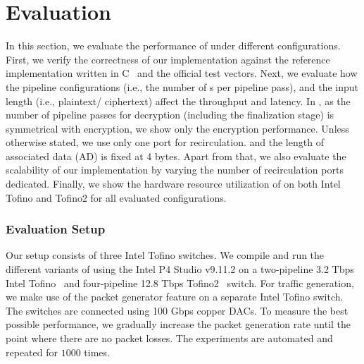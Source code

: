 \section{Evaluation}
\label{sec:eval}

In this section, we evaluate the performance of \sysname under different configurations.
First, we verify the correctness of our implementation against the reference implementation written in C~\cite{ascon-github} and the official test vectors.
Next, we evaluate how the pipeline configurations (i.e., the number of {\pround}s per pipeline pass), and the input length (i.e., plaintext/ ciphertext) affect the throughput and latency.
In \sysname, as the number of pipeline passes for decryption (including the finalization stage) is symmetrical with encryption, 
we show only the encryption performance.
Unless otherwise stated, we use only one port for recirculation. and the length of associated data (AD) is fixed at 4 bytes.
Apart from that, we also evaluate the scalability of our implementation by varying the number of recirculation ports dedicated.
Finally, we show the hardware resource utilization of \sysname on both Intel Tofino and Tofino2 for all evaluated configurations.

\subsubsection{Evaluation Setup}
Our setup consists of three Intel Tofino switches.
We compile and run the different variants of \sysname using the Intel P4 Studio v9.11.2 on a two-pipeline 3.2 Tbps Intel Tofino~\cite{intel-tofino-1} and four-pipeline 12.8 Tbps Tofino2~\cite{intel-tofino-2} switch. %
For traffic generation, we make use of the packet generator feature on a separate Intel Tofino switch. 
The switches are connected using 100 Gbps copper DACs.
To measure the best possible performance, we gradually increase the packet generation rate until the point where there are no packet losses. 
The experiments are automated and repeated for $1000$ times.


